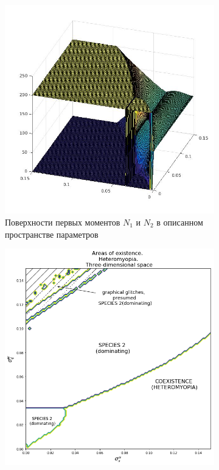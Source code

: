 \begin{figure}[ht]
	\centering
	\begin{subfigure}{.5\textwidth}
		\centering
		\includegraphics[width=.93\linewidth]{N1N2hm08D3.jpg}
		\caption{Поверхности первых моментов \(N_1\) и \(N_2\) в описанном пространстве параметров}
		\label{fig:hmd3:sub1}
	\end{subfigure}%
	\begin{subfigure}{.5\textwidth}
		\centering
		\includegraphics[width=.93\linewidth]{arhm08d3.png}

\end{subfigure}
\end{figure}
